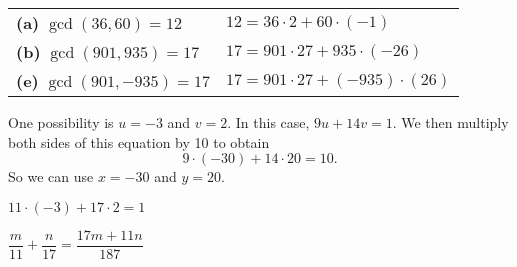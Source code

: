 \begin{list}{\bf{\ref{exer:sec81-4}.}}
\item \begin{tabular}[t] {l l}
\textbf{(a)} $\gcd ( {36, 60} ) = 12$  & $12 = 36 \cdot 2 + 60 \cdot ( { - 1} )$ \\
\textbf{(b)} $\gcd ( {901, 935} ) = 17$	& $17 = 901 \cdot 27 + 935 \cdot ( { - 26} )$ \\
\textbf{(e)} $\gcd ( {901, -935} ) = 17$	& $17 = 901 \cdot 27 + (-935) \cdot ( { 26} )$ \\
\end{tabular}
\end{list}


\begin{list}{\bf{\ref{exer81:solvingeqn}.}}
\item \begin{list}{\bf{(a)}}
\item One possibility is $u = -3$ and $v = 2$.  In this case, $9u + 14v = 1$.  We then multiply both sides of this equation by 10 to obtain
\[
9 \cdot (-30) + 14 \cdot 20 = 10.
\]
So we can use $x = -30$ and $y = 20$.
\end{list}
\end{list}



\begin{multicols}{2}
\begin{list}{\bf{\ref{exer:gcdandfractions}.}}
\item \begin{list}{\bf{(a)}}
\item $11 \cdot (-3) + 17 \cdot 2 = 1$
\end{list}
\end{list}

\begin{list}{}
\item \begin{list}{\bf{(b)}}
\item $\dfrac{m}{11} + \dfrac{n}{17} = \dfrac{17m +11n}{187}$
\end{list}
\end{list}
\end{multicols}
\hbreak
\endinput


